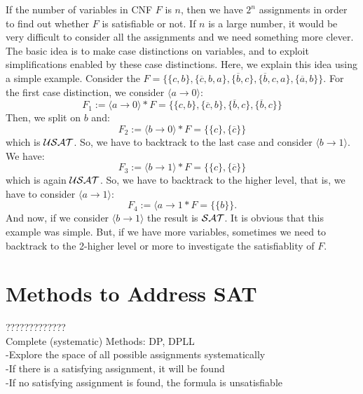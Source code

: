 \documentclass[12pt]{book}
\begin{document}
\begin{examp}\label{exp:bdd}
      If the number of variables in CNF $F$ is $n$, then we have $2^n$ assignments in order to find out whether $F$ is satisfiable or not.
      If $n$ is a large number, it would be very difficult to consider all the assignments and we need something more clever.
      The basic idea is to make case distinctions on variables, and to exploit simplifications enabled by these case distinctions.
      Here, we explain this idea using a simple example. Consider the $F = \{ \{c,b\}, \{\overline{c},b,a\}, \{\overline{b},c\}, \{\overline{b},c,a\}, \{{\overline{a},b}\} \}$. 
      For the first case distinction, we consider $\langle a \to 0 \rangle$:
      $$ F_1 := \langle a \to 0 \rangle * F = \{ \{c,b\}, \{\overline{c},b\}, \{\overline{b},c\}, \{\overline{b},c\} \}$$
      Then, we split on $b$ and:
      $$ F_2 := \langle b \to 0 \rangle * F = \{ \{c\}, \{\overline{c}\} \}$$
      which is $\mathcal{USAT}$. So, we have to backtrack to the last case and consider $\langle b \to 1 \rangle$. We have:
      $$ F_3 := \langle b \to 1 \rangle * F = \{ \{c\}, \{\overline{c}\} \}$$
      which is again $\mathcal{USAT}$. So, we have to backtrack to the higher level, that is, we have to consider $\langle a \to 1 \rangle$:
      $$ F_4 := \langle a \to 1 * F = \{ \{b\} \}.$$
      And  now, if we consider $\langle b \to 1 \rangle$ the result is $\mathcal{SAT}$. It is obvious that this example was simple. But, if we have more variables, 
      sometimes we need to backtrack to the 2-higher level or more to investigate the satisfiablity of $F$.
\end{examp}
\section{Methods to Address SAT}
\label{sec:Methods to Address SAT}

?????????????\\
Complete (systematic) Methods: DP, DPLL\\
-Explore the space of all possible assignments systematically \\
-If there is a satisfying assignment, it will be found \\
-If no satisfying assignment is found, the formula is unsatisfiable \\
\end{document}
